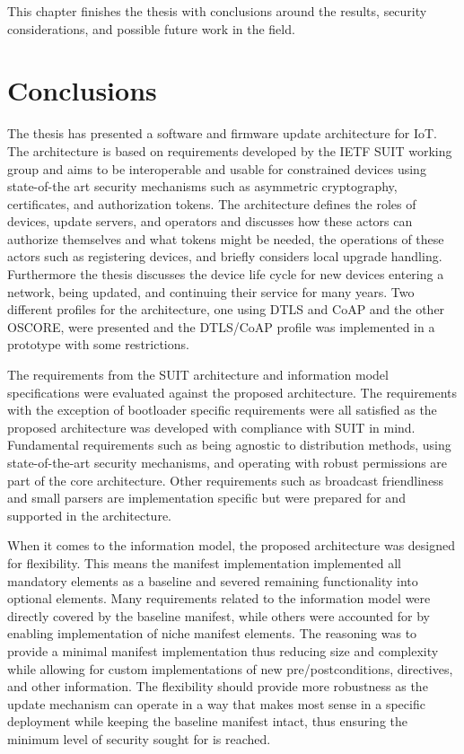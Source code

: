 \documentclass[0-thesis.tex]{subfiles}
\begin{document}
This chapter finishes the thesis with conclusions around the results, security
considerations, and possible future work in the field.

\section{Conclusions}
\label{sec:Conclusions}
The thesis has presented a software and firmware update architecture for IoT. The
architecture is based on requirements developed by the IETF SUIT working group and aims to
be interoperable and usable for constrained devices using state-of-the art security
mechanisms such as asymmetric cryptography, certificates, and authorization tokens. The
architecture defines the roles of devices, update servers, and operators and discusses how
these actors can authorize themselves and what tokens might be needed, the operations of
these actors such as registering devices, and briefly considers local upgrade handling.
Furthermore the thesis discusses the device life cycle for new devices entering a network,
being updated, and continuing their service for many years. Two different profiles for the
architecture, one using DTLS and CoAP and the other OSCORE, were presented and the
DTLS/CoAP profile was implemented in a prototype with some restrictions.

The requirements from the SUIT architecture and information model specifications were
evaluated against the proposed architecture. The requirements with the exception of
bootloader specific requirements were all satisfied as the proposed architecture was
developed with compliance with SUIT in mind. Fundamental requirements such as being
agnostic to distribution methods, using state-of-the-art security mechanisms, and
operating with robust permissions are part of the core architecture. Other requirements
such as broadcast friendliness and small parsers are implementation specific but were
prepared for and supported in the architecture.

When it comes to the information model, the proposed architecture was designed for
flexibility. This means the manifest implementation implemented all mandatory elements as
a baseline and severed remaining functionality into optional elements. Many requirements
related to the information model were directly covered by the baseline manifest, while
others were accounted for by enabling implementation of niche manifest elements. The
reasoning was to provide a minimal manifest implementation thus reducing size and
complexity while allowing for custom implementations of new pre/postconditions,
directives, and other information. The flexibility should provide more robustness as the
update mechanism can operate in a way that makes most sense in a specific deployment while
keeping the baseline manifest intact, thus ensuring the minimum level of security sought
for is reached. 
\end{document}
